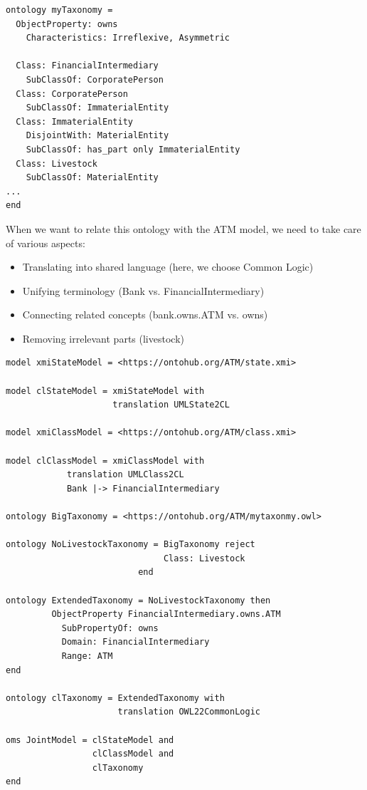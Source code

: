 \documentclass[10pt,fleqn,%
\ifpretendfinal
final%
\else
draft%
\fi,
]{scrreprt}
\begin{document}
\begin{lstlisting}[basicstyle=\ttfamily,language=dolText,morekeywords={props,ObjectProperty,Class,DisjointUnionOf,SubClassOf,DisjointWith, Irreflexive, Characteristics,Transitive,Asymmetric,SubPropertyOf,DisjointClasses,EquivalentTo,inverse,only,forall,iff,if,or,exists,sort,ops,in,approximate,extract},escapechar=@,mathescape]
ontology myTaxonomy =
  ObjectProperty: owns 
    Characteristics: Irreflexive, Asymmetric

  Class: FinancialIntermediary
    SubClassOf: CorporatePerson 
  Class: CorporatePerson
    SubClassOf: ImmaterialEntity
  Class: ImmaterialEntity
    DisjointWith: MaterialEntity
    SubClassOf: has_part only ImmaterialEntity
  Class: Livestock 	
    SubClassOf: MaterialEntity 
...
end
\end{lstlisting}

When we want to relate this ontology with the ATM model, 
we need to take care of various aspects:
\begin{itemize}
  \item Translating into shared language (here, we choose Common Logic)
  \item Unifying terminology (Bank vs. FinancialIntermediary)
  \item Connecting related concepts (bank.owns.ATM vs. owns)
  \item Removing irrelevant parts (livestock) 
\end{itemize}

\begin{lstlisting}[basicstyle=\ttfamily\small,language=dolText,morekeywords={props,ObjectProperty,Class,DisjointUnionOf,SubClassOf,DisjointWith, OMS, Characteristics,Transitive,Asymmetric,translation,SubPropertyOf,DisjointClasses,EquivalentTo,inverse,only,forall,iff,if,or,exists,sort,ops,in,approximate,extract,oms,model},escapechar=@,mathescape]
model xmiStateModel = <https://ontohub.org/ATM/state.xmi>

model clStateModel = xmiStateModel with
                     translation UMLState2CL

model xmiClassModel = <https://ontohub.org/ATM/class.xmi>			

model clClassModel = xmiClassModel with 
            translation UMLClass2CL 
            Bank |-> FinancialIntermediary

ontology BigTaxonomy = <https://ontohub.org/ATM/mytaxonmy.owl>			

ontology NoLivestockTaxonomy = BigTaxonomy reject
                               Class: Livestock
						  end

ontology ExtendedTaxonomy = NoLivestockTaxonomy then 
         ObjectProperty FinancialIntermediary.owns.ATM
           SubPropertyOf: owns 
           Domain: FinancialIntermediary 
           Range: ATM
end

ontology clTaxonomy = ExtendedTaxonomy with 
                      translation OWL22CommonLogic

oms JointModel = clStateModel and 
                 clClassModel and 
                 clTaxonomy
end
\end{lstlisting}
\end{document}
